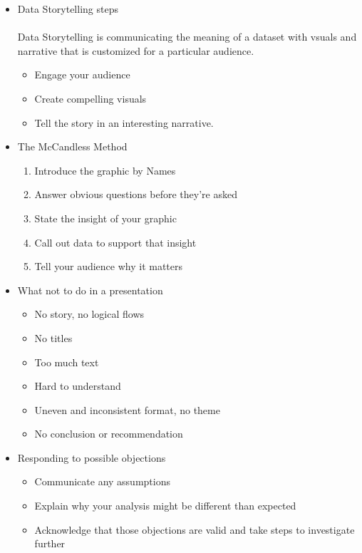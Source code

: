 \documentclass[a4paper]{article}
\begin{document}
\begin{itemize}
        \item Data Storytelling steps 
            \\\\ Data Storytelling is communicating the meaning of a dataset with vsuals and narrative that is
            customized for a particular audience.
            
            \begin{itemize}
                \item Engage your audience
                \item Create compelling visuals
                \item Tell the story in an interesting narrative.
            \end{itemize}

        \item The McCandless Method
            \begin{enumerate}
                \item Introduce the graphic by Names
                \item Answer obvious questions before they're asked
                \item State the insight of your graphic
                \item Call out data to support that insight
                \item Tell your audience why it matters
            \end{enumerate}

        \item What not to do in a presentation 
            \begin{itemize}
                \item No story, no logical flows
                \item No titles 
                \item Too much text 
                \item Hard to understand
                \item Uneven and inconsistent format, no theme 
                \item No conclusion or recommendation
            \end{itemize}

        \item Responding to possible objections
            \begin{itemize}
            \item Communicate any assumptions
            \item Explain why your analysis might be different than expected 
            \item Acknowledge that those objections are valid and take steps to investigate further
        \end{itemize}


\end{itemize}
\end{document}
